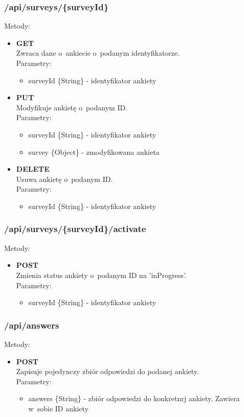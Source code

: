 \documentclass[12pt,a4paper,notitlepage]{article}
\begin{document}
\subsubsection{/api/surveys/\{surveyId\}}
Metody:
\begin{itemize}
\item \textbf{GET} \\ Zwraca dane o~ankiecie o~podanym identyfikatorze. \\ Parametry:
	\begin{itemize}
	\item surveyId \{String\} - identyfikator ankiety
	\end{itemize}
\item \textbf{PUT} \\ Modyfikuje ankietę o~podanym ID. \\ Parametry:
	\begin{itemize}
	\item surveyId \{String\} - identyfikator ankiety
	\item survey \{Object\} - zmodyfikowana ankieta
	\end{itemize}

\item \textbf{DELETE} \\ Usuwa ankietę o~podanym ID. \\ Parametry:
	\begin{itemize}
	\item surveyId \{String\} - identyfikator ankiety
	\end{itemize}
\end{itemize}

\subsubsection{/api/surveys/\{surveyId\}/activate}
Metody:
\begin{itemize}
\item \textbf{POST} \\ Zmienia status ankiety o~podanym ID na 'inProgress'. \\ Parametry:
	\begin{itemize}
	\item surveyId \{String\} - identyfikator ankiety
	\end{itemize}

\end{itemize}

\subsubsection{/api/answers}
Metody:
\begin{itemize}
\item \textbf{POST} \\ Zapisuje pojedynczy zbiór odpowiedzi do podanej ankiety. \\ Parametry:
	\begin{itemize}
	\item answers \{String\} - zbiór odpowiedzi do konkretnrj ankiety. Zawiera w~sobie ID ankiety
	\end{itemize}

\end{itemize}
\end{document}
